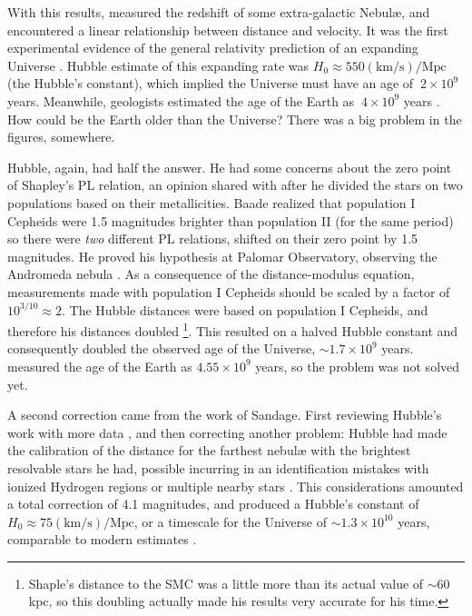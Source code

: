 
With this results, \cite{Hubble1929} measured the redshift of some extra-galactic Nebul\ae{}, 
and encountered a linear relationship between distance and velocity.
It was the first experimental evidence of the general relativity prediction of an expanding Universe \citep{Fiedmann1922,Lemaitre1927}.
Hubble estimate of this expanding rate was $H_0 \approx 550 (\text{km}/\text{s})/\text{Mpc}$ (the Hubble's constant), 
which implied the Universe must have an age of $~2\times10^9$ years. 
Meanwhile, geologists estimated the age of the Earth as $~4\times10^9$ years \citep[for an historical account see]{Dalrymple1994}.
How could be the Earth older than the Universe? There was a big problem in the figures, somewhere.


Hubble, again, had half the answer. He had some concerns about the zero point of Shapley's PL relation, 
an opinion shared with \cite{Baade1944} after he divided the stars on two populations based on their metallicities.
Baade realized that population I Cepheids were 1.5 magnitudes brighter than population II (for the same period) 
so there were \textit{two} different PL relations, shifted on their zero point by 1.5 magnitudes.
He proved his hypothesis at Palomar Observatory, observing the Andromeda nebula \citep{Baade1956,Arp1955}.
As a consequence of the distance-modulus equation, measurements made with population I Cepheids should be scaled by a factor of $10^{3/10}\approx 2$.
The Hubble distances were based on population I Cepheids, and  therefore his distances doubled
\footnote{Shaple's distance to the SMC was a little more than its actual value of $\sim 60$ kpc, so this doubling actually made his results very accurate for his time.}. 
This resulted on a halved Hubble constant and consequently doubled the observed age of the Universe, $\sim1.7\times 10^9$ years.
\cite{Patterson1955} measured the age of the Earth as $4.55\times10^9$ years, so the problem was not solved yet.


A second correction came from the work of Sandage. 
First reviewing Hubble's work with more data \citep{Sandage1956}, and then correcting another problem:
Hubble had made the calibration of the distance for the farthest nebul\ae{} with the brightest resolvable stars he had,
possible incurring in an identification mistakes with ionized Hydrogen regions or multiple nearby stars \citep{Sandage1958}.
This considerations amounted a total correction of 4.1 magnitudes, 
and produced a Hubble's constant of $H_0 \approx 75 (\text{km}/\text{s})/\text{Mpc}$, 
or a timescale for the Universe of $\sim1.3\times 10^{10}$ years, comparable to modern estimates \citep{Freedman2001}.

